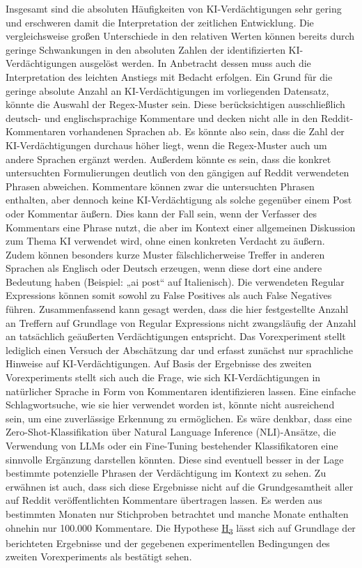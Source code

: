 Insgesamt sind die absoluten Häufigkeiten von KI-Verdächtigungen sehr gering und erschweren damit die Interpretation der zeitlichen Entwicklung. Die vergleichsweise großen Unterschiede in den relativen Werten können bereits durch geringe Schwankungen in den absoluten Zahlen der identifizierten KI-Verdächtigungen ausgelöst werden. In Anbetracht dessen muss auch die Interpretation des leichten Anstiegs mit Bedacht erfolgen. Ein Grund für die geringe absolute Anzahl an KI-Verdächtigungen im vorliegenden Datensatz, könnte die Auswahl der Regex-Muster sein. Diese berücksichtigen ausschließlich deutsch- und englischsprachige Kommentare und decken nicht alle in den Reddit-Kommentaren vorhandenen Sprachen ab. Es könnte also sein, dass die Zahl der KI-Verdächtigungen durchaus höher liegt, wenn die Regex-Muster auch um andere Sprachen ergänzt werden. Außerdem könnte es sein, dass die konkret untersuchten Formulierungen deutlich von den gängigen auf Reddit verwendeten Phrasen abweichen. Kommentare können zwar die untersuchten Phrasen enthalten, aber dennoch keine KI-Verdächtigung als solche gegenüber einem Post oder Kommentar äußern. Dies kann der Fall sein, wenn der Verfasser des Kommentars eine Phrase nutzt, die aber im Kontext einer allgemeinen Diskussion zum Thema KI verwendet wird, ohne einen konkreten Verdacht zu äußern. Zudem können besonders kurze Muster fälschlicherweise Treffer in anderen Sprachen als Englisch oder Deutsch erzeugen, wenn diese dort eine andere Bedeutung haben (Beispiel: „ai post“ auf Italienisch). Die verwendeten Regular Expressions können somit sowohl zu False Positives als auch False Negatives führen. Zusammenfassend kann gesagt werden, dass die hier festgestellte Anzahl an Treffern auf Grundlage von Regular Expressions nicht zwangsläufig der Anzahl an tatsächlich geäußerten Verdächtigungen entspricht. Das Vorexperiment stellt lediglich einen Versuch der Abschätzung dar und erfasst zunächst nur sprachliche Hinweise auf KI-Verdächtigungen. Auf Basis der Ergebnisse des zweiten Vorexperiments stellt sich auch die Frage, wie sich KI-Verdächtigungen in natürlicher Sprache in Form von Kommentaren identifizieren lassen. Eine einfache Schlagwortsuche, wie sie hier verwendet worden ist, könnte nicht ausreichend sein, um eine zuverlässige Erkennung zu ermöglichen. Es wäre denkbar, dass eine Zero-Shot-Klassifikation über Natural Language Inference (NLI)-Ansätze, die Verwendung von LLMs oder ein Fine-Tuning bestehender Klassifikatoren eine sinnvolle Ergänzung darstellen könnten. Diese sind eventuell besser in der Lage bestimmte potenzielle Phrasen der Verdächtigung im Kontext zu sehen. Zu erwähnen ist auch, dass sich diese Ergebnisse nicht auf die Grundgesamtheit aller auf Reddit veröffentlichten Kommentare übertragen lassen. Es werden aus bestimmten Monaten nur Stichproben betrachtet und manche Monate enthalten ohnehin nur 100.000 Kommentare. Die Hypothese \hyperlink{hp:3}{H\textsubscript{3}} lässt sich auf Grundlage der berichteten Ergebnisse und der gegebenen experimentellen Bedingungen des zweiten Vorexperiments als bestätigt sehen. \\
